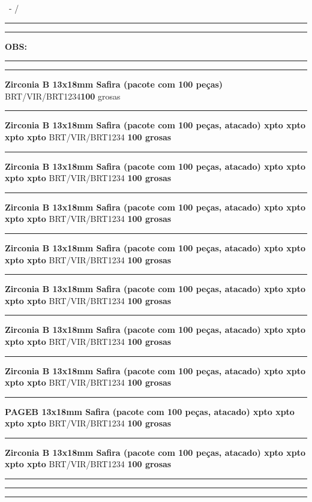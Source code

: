 \documentclass[10pt]{article}
\begin{document}
\footnotesize \bairro\ - \cidade/\estado
\vskip 3pt


\hrule\vskip 1pt\hrule\vskip 5pt
\footnotesize\textbf{OBS: }\observacao
\vskip 5pt
\hrule\vskip 1pt


\def\codproduto{BRT/VIR/BRT1234}                                        %
\def\nomeproduto{Zirconia B 13x18mm Safira (pacote com 100 peças)}      %
\def\quantidade{100}                                                    %
\def\unidade{grosas}                                                    %

\hrule\vskip 3pt
\footnotesize\textbf{\nomeproduto}
\vskip 1pt
\footnotesize \codproduto \hfill \textbf{\quantidade} \unidade
\vskip 1pt


\hrule\vskip 3pt
\footnotesize\textbf{Zirconia B 13x18mm Safira (pacote com 100 peças, atacado) xpto xpto xpto xpto}
\vskip 1pt
\footnotesize BRT/VIR/BRT1234 \hfill \textbf{100 grosas}
\vskip 1pt

\hrule\vskip 3pt
\footnotesize\textbf{Zirconia B 13x18mm Safira (pacote com 100 peças, atacado) xpto xpto xpto xpto}
\vskip 1pt
\footnotesize BRT/VIR/BRT1234 \hfill \textbf{100 grosas}
\vskip 1pt

\hrule\vskip 3pt
\footnotesize\textbf{Zirconia B 13x18mm Safira (pacote com 100 peças, atacado) xpto xpto xpto xpto}
\vskip 1pt
\footnotesize BRT/VIR/BRT1234 \hfill \textbf{100 grosas}
\vskip 1pt

\hrule\vskip 3pt
\footnotesize\textbf{Zirconia B 13x18mm Safira (pacote com 100 peças, atacado) xpto xpto xpto xpto}
\vskip 1pt
\footnotesize BRT/VIR/BRT1234 \hfill \textbf{100 grosas}
\vskip 1pt

\hrule\vskip 3pt
\footnotesize\textbf{Zirconia B 13x18mm Safira (pacote com 100 peças, atacado) xpto xpto xpto xpto}
\vskip 1pt
\footnotesize BRT/VIR/BRT1234 \hfill \textbf{100 grosas}
\vskip 1pt

\hrule\vskip 3pt
\footnotesize\textbf{Zirconia B 13x18mm Safira (pacote com 100 peças, atacado) xpto xpto xpto xpto}
\vskip 1pt
\footnotesize BRT/VIR/BRT1234 \hfill \textbf{100 grosas}
\vskip 1pt

\hrule\vskip 3pt
\footnotesize\textbf{Zirconia B 13x18mm Safira (pacote com 100 peças, atacado) xpto xpto xpto xpto}
\vskip 1pt
\footnotesize BRT/VIR/BRT1234 \hfill \textbf{100 grosas}
\vskip 1pt

\hrule\vskip 3pt
\footnotesize\textbf{PAGEB 13x18mm Safira (pacote com 100 peças, atacado) xpto xpto xpto xpto}
\vskip 1pt
\footnotesize BRT/VIR/BRT1234 \hfill \textbf{100 grosas}
\vskip 1pt

\hrule\vskip 3pt
\footnotesize\textbf{Zirconia B 13x18mm Safira (pacote com 100 peças, atacado) xpto xpto xpto xpto}
\vskip 1pt
\footnotesize BRT/VIR/BRT1234 \hfill \textbf{100 grosas}
\vskip 1pt

\hrule\vskip 1pt\hrule\vskip 1pt\hrule
\end{document}
